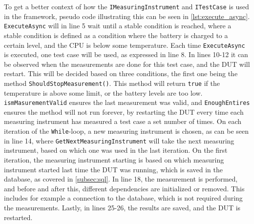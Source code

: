 To get a better context of how the \texttt{IMeasuringInstrument} and \texttt{ITestCase} is used in the framework, pseudo code illustrating this can be seen in \cref{lst:execute_async}. \texttt{ExecuteAsync} will in line 5 wait until a stable condition is reached, where a stable condition is defined as a condition where the battery is charged to a certain level, and the CPU is below some temperature. Each time \texttt{ExecuteAsync} is executed, one test case will be used, as expressed in line 8. In lines 10-12 it can be observed when the measurements are done for this test case, and the DUT will restart. This will be decided based on three conditions, the first one being the method \texttt{ShouldStopMeasurement()}. This method will return \texttt{true} if the temperature is above some limit, or the battery levels are too low. \texttt{ismMasurementValid} ensures the last measurement was valid, and \texttt{EnoughEntires} ensures the method will not run forever, by restarting the DUT every time each measuring instrument has measured a test case a set number of times. On each iteration of the \texttt{While}-loop, a new measuring instrument is chosen, as can be seen in line 14, where \texttt{GetNextMeasuringInstrument} will take the next measuring instrument, based on which one was used in the last iteration. On the first iteration, the measuring instrument starting is based on which measuring instrument started last time the DUT was running, which is saved in the database, as covered in \cref{subsec:sql}. In line 18, the measurement is performed, and before and after this, different dependencies are initialized or removed. This includes for example a connection to the database, which is not required during the measurements. Lastly, in lines 25-26, the results are saved, and the DUT is restarted. 



